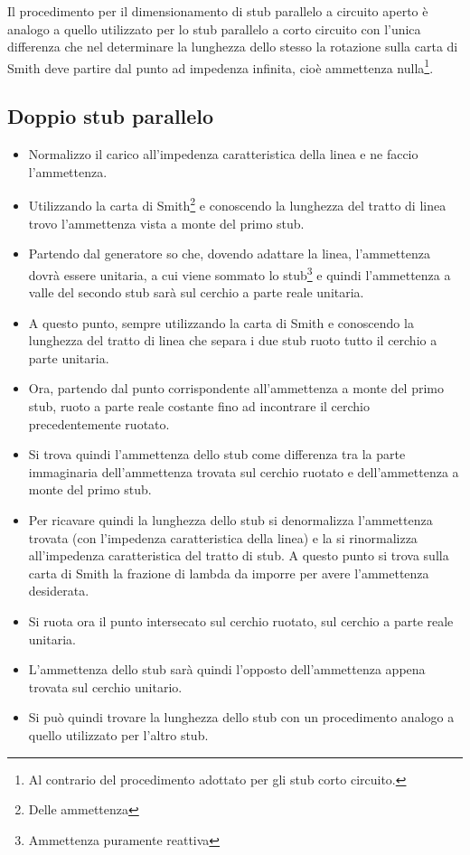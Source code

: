 \documentclass[10pt,a4paper]{report}
\begin{document}
		Il procedimento per il dimensionamento di stub parallelo a circuito aperto è analogo a quello utilizzato per lo stub parallelo a corto circuito con l'unica differenza che nel determinare la lunghezza dello stesso la rotazione sulla carta di Smith deve partire dal punto ad impedenza infinita, cioè ammettenza nulla\footnote{Al contrario del procedimento adottato per gli stub corto circuito.}.



		\subsection{Doppio stub parallelo}

			\begin{itemize}
			
			\item Normalizzo il carico all'impedenza caratteristica della linea e ne faccio l'ammettenza.
			\item Utilizzando la carta di Smith\footnote{Delle ammettenza} e conoscendo la lunghezza del tratto di linea trovo l'ammettenza vista a monte del primo stub.  
			\item Partendo dal generatore so che, dovendo adattare la linea, l'ammettenza dovrà essere unitaria, a cui viene sommato lo stub\footnote{Ammettenza puramente reattiva} e quindi l'ammettenza a valle del secondo stub sarà sul cerchio a parte reale unitaria.  
			\item A questo punto, sempre utilizzando la carta di Smith e conoscendo la lunghezza del tratto di linea che separa i due stub ruoto tutto il cerchio a parte unitaria.
			\item Ora, partendo dal punto corrispondente all'ammettenza a monte del primo stub, ruoto a parte reale costante fino ad incontrare il cerchio precedentemente ruotato.
			\item Si trova quindi l'ammettenza dello stub come differenza tra la parte immaginaria dell'ammettenza trovata sul cerchio ruotato e dell'ammettenza a monte del primo stub. 
			\item Per ricavare quindi la lunghezza dello stub si denormalizza l'ammettenza trovata (con l'impedenza caratteristica della linea) e la si rinormalizza all'impedenza caratteristica del tratto di stub. A questo punto si trova sulla carta di Smith la frazione di lambda da imporre per avere l'ammettenza desiderata.  
			\item Si ruota ora il punto intersecato sul cerchio ruotato, sul cerchio a parte reale unitaria.
			\item L'ammettenza dello stub sarà quindi l'opposto dell'ammettenza appena trovata sul cerchio unitario.
			\item Si può quindi trovare la lunghezza dello stub con un procedimento analogo a quello utilizzato per l'altro stub.
			
			\end{itemize}
\end{document}

